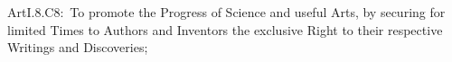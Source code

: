 \documentclass[preview,border=0.80001bp, convert=imagemagick]{standalone}
\begin{document}
\parbox[t][36pt][c]{300pt}{
	\fmmfamily
	ArtI.\textsection8.C8:\ To promote the Progress of Science
	and useful Arts, by securing for limited Times to Authors and
	Inventors the exclusive Right to their respective Writings and
	Discoveries;
}
\end{document}
